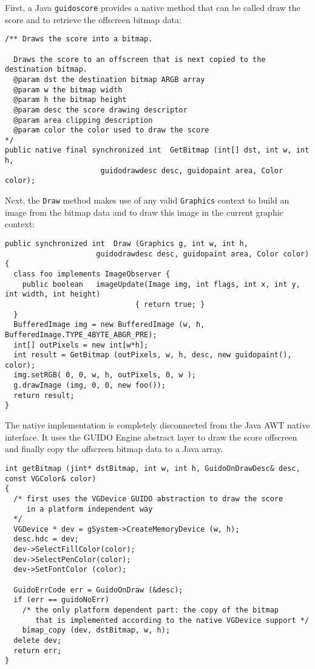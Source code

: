 \documentclass[a4paper]{article}
\newcommand{\code}[1]			{\texttt{#1}}
\begin{document}
First, a Java \code{guidoscore} provides a native method that can be called draw the score and to retrieve the offscreen bitmap data:
{\small \begin{verbatim}
/** Draws the score into a bitmap.
	
  Draws the score to an offscreen that is next copied to the destination bitmap.
  @param dst the destination bitmap ARGB array
  @param w the bitmap width
  @param h the bitmap height
  @param desc the score drawing descriptor
  @param area clipping description
  @param color the color used to draw the score
*/
public native final synchronized int  GetBitmap (int[] dst, int w, int h, 
                      guidodrawdesc desc, guidopaint area, Color color);
\end{verbatim}
}
Next, the \code{Draw} method makes use of any valid \code{Graphics} context to build an image from the bitmap data and to draw this image in the current graphic context:
{\small \begin{verbatim}
public synchronized int  Draw (Graphics g, int w, int h, 
                     guidodrawdesc desc, guidopaint area, Color color) {
  class foo implements ImageObserver {
    public boolean	 imageUpdate(Image img, int flags, int x, int y, int width, int height) 
                              { return true; }
  }
  BufferedImage img = new BufferedImage (w, h, BufferedImage.TYPE_4BYTE_ABGR_PRE);
  int[] outPixels = new int[w*h];
  int result = GetBitmap (outPixels, w, h, desc, new guidopaint(), color);
  img.setRGB( 0, 0, w, h, outPixels, 0, w );
  g.drawImage (img, 0, 0, new foo());
  return result;
}
\end{verbatim}
}

The native implementation is completely disconnected from the Java AWT native interface. 
It uses the GUIDO Engine abstract layer to draw the score offscreen and finally copy the offscreen 
bitmap data to a Java array.

{\small \begin{verbatim}
int getBitmap (jint* dstBitmap, int w, int h, GuidoOnDrawDesc& desc, const VGColor& color)
{
  /* first uses the VGDevice GUIDO abstraction to draw the score
     in a platform independent way
  */
  VGDevice * dev = gSystem->CreateMemoryDevice (w, h);
  desc.hdc = dev;
  dev->SelectFillColor(color);
  dev->SelectPenColor(color);
  dev->SetFontColor (color);

  GuidoErrCode err = GuidoOnDraw (&desc);
  if (err == guidoNoErr)
    /* the only platform dependent part: the copy of the bitmap
       that is implemented according to the native VGDevice support */
    bimap_copy (dev, dstBitmap, w, h);
  delete dev;
  return err;
}
\end{verbatim}
}
\end{document}
